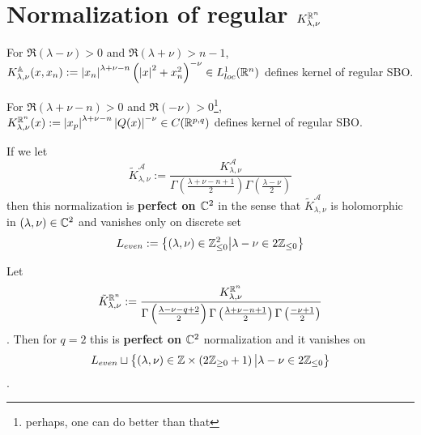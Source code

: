 \documentclass[8pt,pdf,notes]{beamer}
\newcommand{\A}{\mathcal{A}}
\theoremstyle{mystyle}
\begin{document}
\section{Normalization of regular $K_{\lambda,\nu}^{\mathbb{R}^{n}}$}
\begin{frame}
	\begin{theorem}
		For $\Re(\lambda-\nu)>0$ and $\Re(\lambda+\nu)>n-1$, $K_{\lambda,\nu}^{\mathbb{A}}(x,x_n):=\left|x_n\right|^{\lambda+\nu-n}
		\left( \left|x\right|^2+x_n^2 \right)^{-\nu}\in L_{loc}^1(\mathbb{R}^n)$ defines kernel of regular SBO.
		\label{}
	\end{theorem}
	\begin{theorem}[$G:=O(p+1,q+1),\;n:=p+q$]
		For $\Re(\lambda+\nu-n)>0$ and $\Re(-\nu)>0$\footnote{perhaps, one can do better than that},
		$K^{\mathbb{R}^n}_{\lambda,\nu}(x):=\left|x_p\right|^{\lambda+\nu-n}\left|Q(x)\right|^{-\nu
		}\in C(\mathbb{R}^{p,q})$ defines kernel of regular SBO. 
		\label{}
	\end{theorem}
\end{frame}
\begin{frame}
	\begin{theorem}
		If we let \[\tilde{K}_{\lambda,\nu}^{\A}:=\frac{
			K_{\lambda,\nu}^{\A}}{\Gamma\left( \frac{\lambda+\nu-n+1}{2} \right)\Gamma
		\left( \frac{\lambda-\nu}{2} \right)}\] then this normalization is {\bf perfect on $\mathbb{C}^2$} in the sense
		that $\tilde{K}_{\lambda,\nu}^{\A}$ is holomorphic in $(\lambda,\nu)\in\mathbb{C}^2$ and vanishes only on discrete
		set \[L_{even}:=\left\{(\lambda,\nu)\in\mathbb{Z}_{\le0}^2\big| \lambda-\nu\in2\mathbb{Z}_{\le0}\right\}\]
		\label{}
	\end{theorem}
	\begin{theorem}[$G:=O(p+1,q+1),\;n:=p+q$]
		Let \[\tilde{K}_{\lambda,\nu}^{\mathbb{R}^n}:=\frac{K_{\lambda,\nu}^{\mathbb{R}^n}}{\Gamma\left( \frac{\lambda-\nu-q+2}{2} \right)
		\Gamma\left( \frac{\lambda+\nu-n+1}{2} \right)\Gamma\left( \frac{-\nu+1}{2} \right)}\]. Then for $q=2$
		this is {\bf perfect on $\mathbb{C}^2$} normalization and it vanishes on \[L_{even}\sqcup\left\{(\lambda,\nu)\in\mathbb{Z}\times
		\left( 2\mathbb{Z}_{\ge0}+1 \right)\big| \lambda-\nu\in2\mathbb{Z}_{\le0}\right\}\].
		\label{}
	\end{theorem}
\end{frame}
\end{document}
